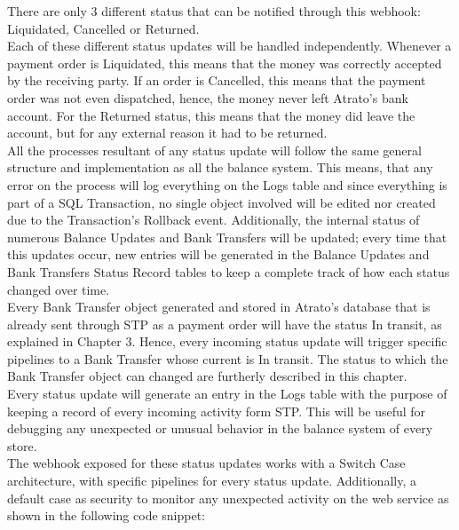 There are only 3 different status that can be notified through this webhook: Liquidated, Cancelled or Returned.\\

Each of these different status updates will be handled independently. Whenever a payment order is Liquidated, this means that the money was correctly accepted by the receiving party. If an order is Cancelled, this means that the payment order was not even dispatched, hence, the money never left Atrato’s bank account. For the Returned status, this means that the money did leave the account, but for any external reason it had to be returned.\\

All the processes resultant of any status update will follow the same general structure and implementation as all the balance system. This means, that any error on the process will log everything on the Logs table and since everything is part of a SQL Transaction, no single object involved will be edited nor created due to the Transaction’s Rollback event. Additionally, the internal status of numerous Balance Updates and Bank Transfers will be updated; every time that this updates occur, new entries will be generated in the Balance Updates and Bank Transfers Status Record tables to keep a complete track of how each status changed over time.\\

Every Bank Transfer object generated and stored in Atrato’s database that is already sent through STP as a payment order will have the status In transit, as explained in Chapter 3. Hence, every incoming status update will trigger specific pipelines to a Bank Transfer whose current is In transit. The status to which the Bank Transfer object can changed are furtherly described in this chapter.\\

Every status update will generate an entry in the Logs table with the purpose of keeping a record of every incoming activity form STP. This will be useful for debugging any unexpected or unusual behavior in the balance system of every store.\\

The webhook exposed for these status updates works with a Switch Case architecture, with specific pipelines for every status update. Additionally, a default case as security to monitor any unexpected activity on the web service as shown in the following code snippet:\\

